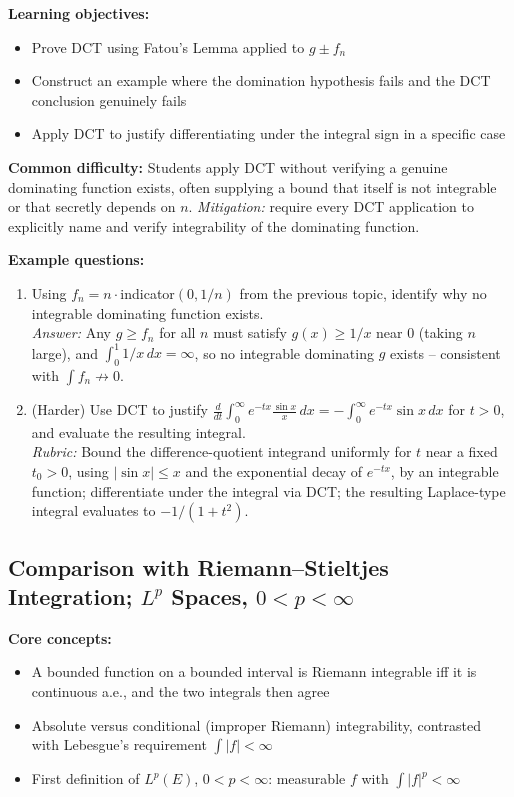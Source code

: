 \documentclass[11pt]{article}
\begin{document}
\textbf{Learning objectives:}
\begin{itemize}[nosep]
\item Prove DCT using Fatou's Lemma applied to $g\pm f_n$
\item Construct an example where the domination hypothesis fails and the DCT conclusion genuinely fails
\item Apply DCT to justify differentiating under the integral sign in a specific case
\end{itemize}

\textbf{Common difficulty:} Students apply DCT without verifying a genuine dominating function exists, often supplying a bound that itself is not integrable or that secretly depends on $n$. \textit{Mitigation:} require every DCT application to explicitly name and verify integrability of the dominating function.

\textbf{Example questions:}
\begin{enumerate}[nosep]
\item Using $f_n=n\cdot$indicator$(0,1/n)$ from the previous topic, identify why no integrable dominating function exists. \\
\textit{Answer:} Any $g\ge f_n$ for all $n$ must satisfy $g(x)\ge1/x$ near $0$ (taking $n$ large), and $\int_0^1 1/x\,dx=\infty$, so no integrable dominating $g$ exists -- consistent with $\int f_n\not\to0$.
\item (Harder) Use DCT to justify $\frac{d}{dt}\int_0^\infty e^{-tx}\frac{\sin x}{x}\,dx=-\int_0^\infty e^{-tx}\sin x\,dx$ for $t>0$, and evaluate the resulting integral. \\
\textit{Rubric:} Bound the difference-quotient integrand uniformly for $t$ near a fixed $t_0>0$, using $|\sin x|\le x$ and the exponential decay of $e^{-tx}$, by an integrable function; differentiate under the integral via DCT; the resulting Laplace-type integral evaluates to $-1/(1+t^2)$.
\end{enumerate}

\subsection{Comparison with Riemann--Stieltjes Integration; $L^p$ Spaces, $0<p<\infty$}

\textbf{Core concepts:}
\begin{itemize}[nosep]
\item A bounded function on a bounded interval is Riemann integrable iff it is continuous a.e., and the two integrals then agree
\item Absolute versus conditional (improper Riemann) integrability, contrasted with Lebesgue's requirement $\int|f|<\infty$
\item First definition of $L^p(E)$, $0<p<\infty$: measurable $f$ with $\int|f|^p<\infty$
\end{itemize}
\end{document}

